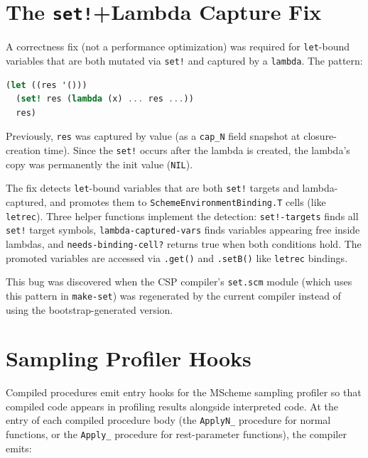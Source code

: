 \documentclass[12pt]{report}
\begin{document}
\section{The \texttt{set!}+Lambda Capture Fix}
\label{sec:opt-letcell}

A correctness fix (not a performance optimization) was required for
\texttt{let}-bound variables that are both mutated via \texttt{set!}
and captured by a \texttt{lambda}.  The pattern:

\begin{lstlisting}[language=Scheme]
(let ((res '()))
  (set! res (lambda (x) ... res ...))
  res)
\end{lstlisting}

\noindent
Previously, \texttt{res} was captured by value (as a
\texttt{cap\_N} field snapshot at closure-creation time).  Since
the \texttt{set!} occurs after the lambda is created, the lambda's
copy was permanently the init value (\texttt{NIL}).

The fix detects \texttt{let}-bound variables that are both
\texttt{set!} targets and lambda-captured, and promotes them to
\texttt{SchemeEnvironmentBinding.T} cells (like \texttt{letrec}).
Three helper functions implement the detection:
\texttt{set!-targets} finds all \texttt{set!} target symbols,
\texttt{lambda-captured-vars} finds variables appearing free inside
lambdas, and \texttt{needs-binding-cell?} returns true when both
conditions hold.  The promoted variables are accessed via
\texttt{.get()} and \texttt{.setB()} like \texttt{letrec} bindings.

This bug was discovered when the CSP compiler's \texttt{set.scm}
module (which uses this pattern in \texttt{make-set}) was
regenerated by the current compiler instead of using the
bootstrap-generated version.

\section{Sampling Profiler Hooks}
\label{sec:opt-profiler}

Compiled procedures emit entry hooks for the MScheme sampling profiler
so that compiled code appears in profiling results alongside
interpreted code.  At the entry of each compiled procedure body
(the \texttt{ApplyN\_} procedure for normal functions, or the
\texttt{Apply\_} procedure for rest-parameter functions), the
compiler emits:
\end{document}
